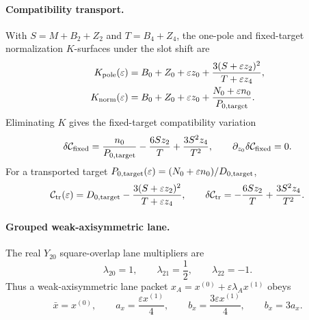 \paragraph{Compatibility transport.}
With \(S=M+B_2+Z_2\) and \(T=B_4+Z_4\), the one-pole and fixed-target
normalization \(K\)-surfaces under the slot shift are
\begin{equation}
\label{eq:stage010-k-surfaces}
\begin{aligned}
K_{\rm pole}(\varepsilon)
&=B_0+Z_0+\varepsilon z_0
+\frac{3(S+\varepsilon z_2)^2}{T+\varepsilon z_4},\\
K_{\rm norm}(\varepsilon)
&=B_0+Z_0+\varepsilon z_0
+\frac{N_0+\varepsilon n_0}{P_{0,\rm target}}.
\end{aligned}
\end{equation}
Eliminating \(K\) gives the fixed-target compatibility variation
\begin{equation}
\label{eq:stage010-compat-fixed}
\delta\mathcal C_{\rm fixed}
=\frac{n_0}{P_{0,\rm target}}
-\frac{6Sz_2}{T}
+\frac{3S^2z_4}{T^2},
\qquad
\partial_{z_0}\delta\mathcal C_{\rm fixed}=0.
\end{equation}
For a transported target
\(P_{0,\rm target}(\varepsilon)=(N_0+\varepsilon n_0)/D_{0,\rm target}\),
\begin{equation}
\label{eq:stage010-compat-transport}
\mathcal C_{\rm tr}(\varepsilon)
=D_{0,\rm target}
-\frac{3(S+\varepsilon z_2)^2}{T+\varepsilon z_4},
\qquad
\delta\mathcal C_{\rm tr}
=-\frac{6Sz_2}{T}+\frac{3S^2z_4}{T^2}.
\end{equation}

\paragraph{Grouped weak-axisymmetric lane.}
The real \(Y_{20}\) square-overlap lane multipliers are
\begin{equation}
\label{eq:stage010-y20-lambdas}
\lambda_{20}=1,\qquad
\lambda_{21}=\frac12,\qquad
\lambda_{22}=-1.
\end{equation}
Thus a weak-axisymmetric lane packet
\(x_A=x^{(0)}+\varepsilon\lambda_Ax^{(1)}\) obeys
\begin{equation}
\label{eq:stage010-weak-axisym-trace}
\bar x=x^{(0)},\qquad
a_x=\frac{\varepsilon x^{(1)}}4,\qquad
b_x=\frac{3\varepsilon x^{(1)}}4,\qquad
b_x=3a_x.
\end{equation}

